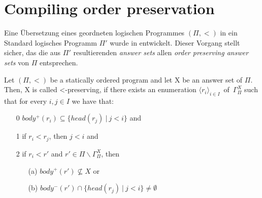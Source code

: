 \section{Compiling order preservation}

Eine Übersetzung eines geordneten logischen Programmes $(\Pi, <)$ in ein
Standard logisches Programm $\Pi'$ wurde in \cite{delgrande2000logic} entwickelt.
Dieser Vorgang stellt sicher, das die aus $\Pi'$ resultierenden \emph{answer sets}
allen \emph{order preserving answer sets} von $\Pi$ entsprechen.

\begin{definition}
  Let $(\Pi, <)$ be a statically ordered program and let X be an answer set of $\Pi$.
  Then, X is called <-preserving, if there exists an enumeration
  $\langle r_i \rangle_{i \in I}$~of~$\Gamma_{\Pi}^X$ such that for every $i, j \in I$
  we have that:
  \begin{itemize}
    \item[0] $body^+(r_i) \subseteq \{ head(r_j)~|~j<i\}$ and \\
    \item[1] if $r_i < r_j$, then $j<i$ and \\
    \item[2] if $r_i < r'$ and $r' \in \Pi \backslash \Gamma_{\Pi}^X$, then
      \begin{itemize}
        \item[(a)] $body^+(r') \not \subseteq X$ or
        \item[(b)] $body^-(r') \cap \{head(r_j)~|~j<i\} \not = \emptyset$
      \end{itemize}
  \end{itemize}
\end{definition}

